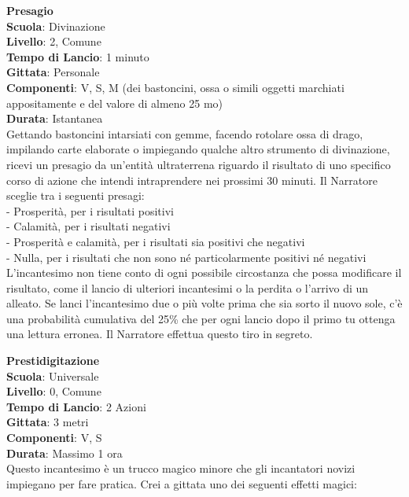 \begin{multicols}{2}
\medskip\textbf{Presagio}\\
\textbf{Scuola}: Divinazione\\
\textbf{Livello}: 2, Comune\\
\textbf{Tempo di Lancio}: 1 minuto\\
\textbf{Gittata}: Personale\\
\textbf{Componenti}: V, S, M (dei bastoncini, ossa o simili oggetti marchiati appositamente e del valore di almeno 25 mo)\\
\textbf{Durata}: Istantanea\\
Gettando bastoncini intarsiati con gemme, facendo rotolare ossa di drago, impilando carte elaborate o impiegando qualche altro strumento di divinazione, ricevi un presagio da un'entità ultraterrena riguardo il risultato di uno specifico corso di azione che intendi intraprendere nei prossimi 30 minuti. Il Narratore sceglie tra i seguenti presagi:\\

- Prosperità, per i risultati positivi\\
- Calamità, per i risultati negativi\\
- Prosperità e calamità, per i risultati sia positivi che negativi\\
- Nulla, per i risultati che non sono né particolarmente positivi né negativi\\

L'incantesimo non tiene conto di ogni possibile circostanza che possa modificare il risultato, come il lancio di ulteriori incantesimi o la perdita o l'arrivo di un alleato. Se lanci l'incantesimo due o più volte prima che sia sorto il nuovo sole, c'è una probabilità cumulativa del 25\% che per ogni lancio dopo il primo tu ottenga una lettura erronea. Il Narratore effettua questo tiro in segreto.

\medskip\textbf{Prestidigitazione}\\
\textbf{Scuola}: Universale\\
\textbf{Livello}: 0, Comune\\
\textbf{Tempo di Lancio}: 2 Azioni\\
\textbf{Gittata}: 3 metri\\
\textbf{Componenti}: V, S\\
\textbf{Durata}: Massimo 1 ora\\
Questo incantesimo è un trucco magico minore che gli incantatori novizi impiegano per fare pratica. Crei a gittata uno dei seguenti effetti magici:\\


\end{multicols}
